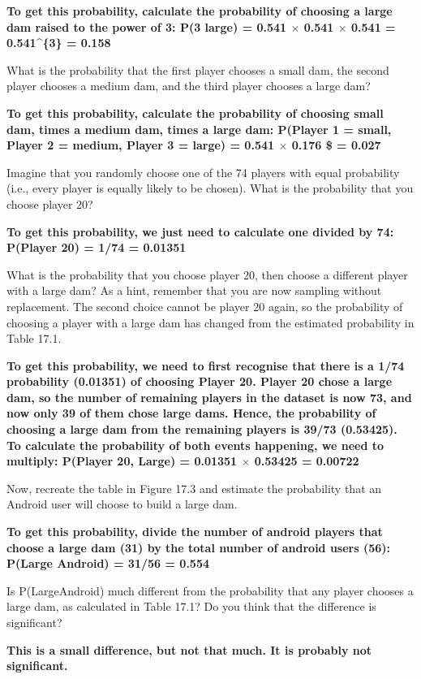 \documentclass[
]{scrbook}
\begin{document}
\textbf{To get this probability, calculate the probability of choosing a large dam raised to the power of 3: P(3 large) = 0.541 \(\times\) 0.541 \(\times\) 0.541 = 0.541\^{}\{3\} = 0.158}

What is the probability that the first player chooses a small dam, the second player chooses a medium dam, and the third player chooses a large dam?

\textbf{To get this probability, calculate the probability of choosing small dam, times a medium dam, times a large dam: P(Player 1 = small, Player 2 = medium, Player 3 = large) = 0.541 \(\times\) 0.176 \$ = 0.027}

Imagine that you randomly choose one of the 74 players with equal probability (i.e., every player is equally likely to be chosen). What is the probability that you choose player 20?

\textbf{To get this probability, we just need to calculate one divided by 74: P(Player 20) = 1/74 = 0.01351}

What is the probability that you choose player 20, then choose a different player with a large dam? As a hint, remember that you are now sampling without replacement. The second choice cannot be player 20 again, so the probability of choosing a player with a large dam has changed from the estimated probability in Table 17.1.

\textbf{To get this probability, we need to first recognise that there is a 1/74 probability (0.01351) of choosing Player 20. Player 20 chose a large dam, so the number of remaining players in the dataset is now 73, and now only 39 of them chose large dams. Hence, the probability of choosing a large dam from the remaining players is 39/73 (0.53425). To calculate the probability of both events happening, we need to multiply: P(Player 20, Large) = 0.01351 \(\times\) 0.53425 = 0.00722}

Now, recreate the table in Figure 17.3 and estimate the probability that an Android user will choose to build a large dam.

\textbf{To get this probability, divide the number of android players that choose a large dam (31) by the total number of android users (56): P(Large \textbar{} Android) = 31/56 = 0.554}

Is P(Large\textbar Android) much different from the probability that any player chooses a large dam, as calculated in Table 17.1? Do you think that the difference is significant?

\textbf{This is a small difference, but not that much. It is probably not significant.}
\end{document}
